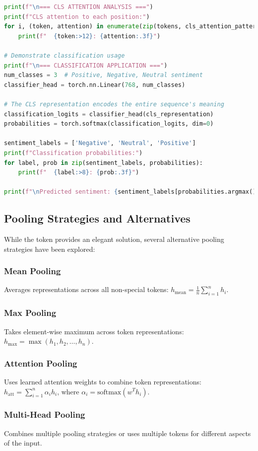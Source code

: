 \begin{lstlisting}[language=Python, caption={CLS token processing and sequence-level aggregation}]
print(f"\n=== CLS ATTENTION ANALYSIS ===")
print(f"CLS attention to each position:")
for i, (token, attention) in enumerate(zip(tokens, cls_attention_pattern)):
    print(f"  {token:>12}: {attention:.3f}")

# Demonstrate classification usage
print(f"\n=== CLASSIFICATION APPLICATION ===")
num_classes = 3  # Positive, Negative, Neutral sentiment
classifier_head = torch.nn.Linear(768, num_classes)

# The CLS representation encodes the entire sequence's meaning
classification_logits = classifier_head(cls_representation)
probabilities = torch.softmax(classification_logits, dim=0)

sentiment_labels = ['Negative', 'Neutral', 'Positive']
print(f"Classification probabilities:")
for label, prob in zip(sentiment_labels, probabilities):
    print(f"  {label:>8}: {prob:.3f}")

print(f"\nPredicted sentiment: {sentiment_labels[probabilities.argmax()]}")
\end{lstlisting}

\subsection{Pooling Strategies and Alternatives}

While the \cls{} token provides an elegant solution, several alternative pooling strategies have been explored:

\subsubsection{Mean Pooling}
Averages representations across all non-special tokens:
$h_{\text{mean}} = \frac{1}{n} \sum_{i=1}^{n} h_i$.

\subsubsection{Max Pooling}
Takes element-wise maximum across token representations:
$h_{\text{max}} = \max(h_1, h_2, \ldots, h_n)$.

\subsubsection{Attention Pooling}
Uses learned attention weights to combine token representations:
$h_{\text{att}} = \sum_{i=1}^{n} \alpha_i h_i$, where $\alpha_i = \text{softmax}(w^T h_i)$.

\subsubsection{Multi-Head Pooling}
Combines multiple pooling strategies or uses multiple \cls{} tokens for different aspects of the input.

